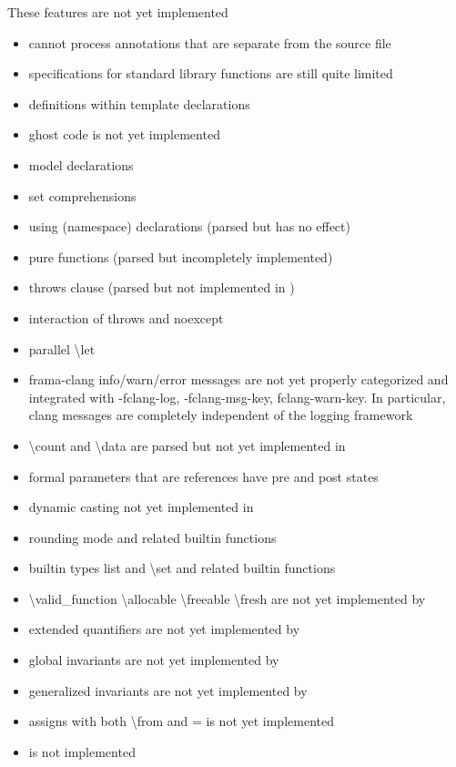 These \acslpp features are not yet implemented
\begin{itemize}

\item \fclang cannot process annotations that are separate from the source file
\item \acslpp specifications for standard \cpp library functions are still quite limited
\item \acslpp definitions within template declarations
\item ghost code is not yet implemented
\item model declarations
\item set comprehensions
\item using (namespace) declarations (parsed but has no effect)
\item pure functions (parsed but incompletely implemented)
\item throws clause (parsed but not implemented in \framac)
\item interaction of throws and noexcept
\item parallel \textbackslash let
\item frama-clang info/warn/error messages are not yet properly categorized and integrated with -fclang-log, -fclang-msg-key, fclang-warn-key. In particular, clang messages are completely independent of the \framac logging framework
\item \textbackslash count and \textbackslash data are parsed but not yet implemented in \framac
\item formal parameters that are references have pre and post states
\item dynamic casting not yet implemented in \framac
\item rounding mode  and related builtin functions
\item builtin types list and \textbackslash set and related builtin functions
\item \textbackslash valid\_function \textbackslash allocable \textbackslash freeable \textbackslash fresh are not yet implemented by \framac
\item extended quantifiers are not yet implemented by \framac
\item global invariants are not yet implemented by \framac
\item generalized invariants are not yet implemented by \framac
\item assigns with both \textbackslash from and = is not yet implemented
\item {} is not implemented
\end{itemize}

